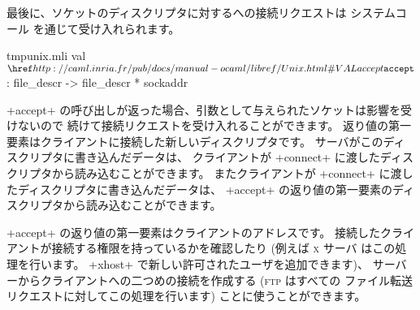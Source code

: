 最後に、ソケットのディスクリプタに対するへの接続リクエストは
システムコール  を通じて受け入れられます。
%
\begin{listingcodefile}{tmpunix.mli}
val $\libvalue{Unix}{accept}$ : file_descr -> file_descr * sockaddr
\end{listingcodefile}
%
\ml+accept+ の呼び出しが返った場合、引数として与えられたソケットは影響を受けないので
続けて接続リクエストを受け入れることができます。
返り値の第一要素はクライアントに接続した新しいディスクリプタです。
サーバがこのディスクリプタに書き込んだデータは、
クライアントが \ml+connect+ に渡したディスクリプタから読み込むことができます。
またクライアントが \ml+connect+ に渡したディスクリプタに書き込んだデータは、
\ml+accept+ の返り値の第一要素のディスクリプタから読み込むことができます。

\ml+accept+ の返り値の第一要素はクライアントのアドレスです。
接続したクライアントが接続する権限を持っているかを確認したり (例えば \textsc{x} サーバ
はこの処理を行います。 \ml+xhost+ で新しい許可されたユーザを追加できます)、
サーバーからクライアントへの二つめの接続を作成する (\textsc{ftp} はすべての
ファイル転送リクエストに対してこの処理を行います) ことに使うことができます。

